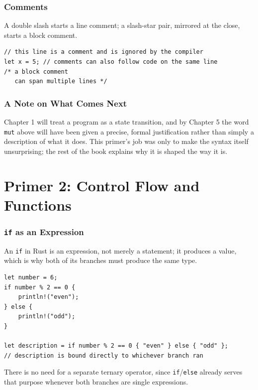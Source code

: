 \documentclass[11pt]{book}
\begin{document}
\subsection*{Comments}

A double slash starts a line comment; a slash-star pair, mirrored at the close, starts a block comment.

\begin{lstlisting}
// this line is a comment and is ignored by the compiler
let x = 5; // comments can also follow code on the same line
/* a block comment
   can span multiple lines */
\end{lstlisting}

\subsection*{A Note on What Comes Next}

Chapter 1 will treat a program as a state transition, and by Chapter 5 the word \texttt{mut} above will have been given a precise, formal justification rather than simply a description of what it does. This primer's job was only to make the syntax itself unsurprising; the rest of the book explains why it is shaped the way it is.

\clearpage

\chapter*{Primer 2: Control Flow and Functions}

\subsection*{\texttt{if} as an Expression}

An \texttt{if} in Rust is an expression, not merely a statement; it produces a value, which is why both of its branches must produce the same type.

\begin{lstlisting}
let number = 6;
if number % 2 == 0 {
    println!("even");
} else {
    println!("odd");
}

let description = if number % 2 == 0 { "even" } else { "odd" };
// description is bound directly to whichever branch ran
\end{lstlisting}

There is no need for a separate ternary operator, since \texttt{if}/\texttt{else} already serves that purpose whenever both branches are single expressions.
\end{document}
